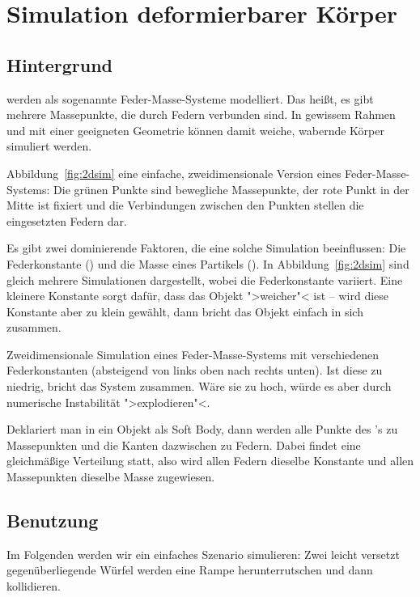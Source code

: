\documentclass[10pt,DIV=14,a4paper]{scrartcl}
\begin{document}
\itE




\pagebreak
\section{Simulation deformierbarer Körper}

\subsection{Hintergrund}
 werden als sogenannte Feder-Masse-Systeme
modelliert. Das heißt, es gibt mehrere Massepunkte, die durch Federn
verbunden sind. In gewissem Rahmen und mit einer geeigneten Geometrie
können damit weiche, wabernde Körper simuliert werden.

Abbildung~\ref{fig:2dsim} eine einfache, zweidimensionale Version eines
Feder-Masse-Systems: Die grünen Punkte sind bewegliche Massepunkte, der
rote Punkt in der Mitte ist fixiert und die Verbindungen zwischen den
Punkten stellen die eingesetzten Federn dar.

Es gibt zwei dominierende Faktoren, die eine solche Simulation
beeinflussen: Die Federkonstante () und die Masse
eines Partikels (). In Abbildung~\ref{fig:2dsim}
sind gleich mehrere Simulationen dargestellt, wobei die Federkonstante
variiert. Eine kleinere Konstante sorgt dafür, dass das Objekt
">weicher"< ist -- wird diese Konstante aber zu klein gewählt, dann
bricht das Objekt einfach in sich zusammen.

{Zweidimensionale Simulation eines Feder-Masse-Systems mit verschiedenen
Federkonstanten (absteigend von links oben nach rechts unten). Ist diese
zu niedrig, bricht das System zusammen. Wäre sie zu hoch, würde es aber
durch numerische Instabilität ">explodieren"<.}

Deklariert man in \aoi ein Objekt als Soft Body, dann werden alle
Punkte des \TriMesh's zu Massepunkten und die Kanten dazwischen zu
Federn. Dabei findet eine gleichmäßige Verteilung statt, also wird allen
Federn dieselbe Konstante und allen Massepunkten dieselbe Masse
zugewiesen.

\subsection{Benutzung}
Im Folgenden werden wir ein einfaches Szenario simulieren: Zwei leicht
versetzt gegenüberliegende Würfel werden eine Rampe herunterrutschen und
dann kollidieren.
\end{document}
